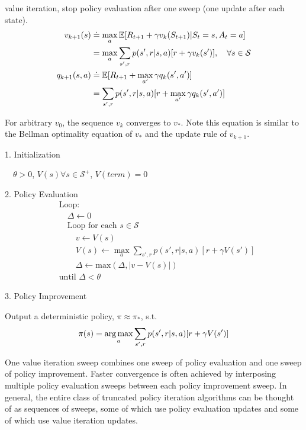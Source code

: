 \documentclass[sutton_barto_notes.tex]{subfiles}
\begin{document}
\begin{definition}
value iteration, stop policy evaluation after one sweep (one update after each state).
\begin{align*}
v_{k+1}(s) & \doteq \max_a \operatorname*{\mathbb{E}} [R_{t+1}+\gamma v_k(S_{t+1})|S_t = s, A_t = a]\\
& = \max_a \sum_{s',r} p(s',r|s,a)[r+\gamma v_k (s')],\quad \forall s \in \mathcal{S} \\
q_{k+1}(s,a) & \doteq \operatorname*{\mathbb{E}}[R_{t+1} + \max_{a'} \gamma q_k (s', a')] \\
& = \sum_{s',r} p(s',r|s,a)[r+\max_{a'} \gamma q_k (s',a')]
\end{align*}
\end{definition}
For arbitrary $v_0$, the sequence ${v_k}$ converges to $v_*$. Note this equation is similar to the Bellman optimality equation of $v_*$ and the update rule of $v_{k+1}$.

\begin{tcolorbox}[width=\textwidth,title={Value Iteration for estimating $\pi \approx \pi_*$}]
1. Initialization

$\quad\theta > 0$, $V(s) \forall s\in\mathcal{S}^+$, $V(term) = 0$

2. Policy Evaluation
\begin{align*}
&\text{Loop:}\\
&\quad\Delta \leftarrow 0\\
&\quad\text{Loop for each } s \in \mathcal{S}\\
&\quad\quad v \leftarrow V(s)\\
&\quad\quad V(s) \leftarrow \max_a \sum_{s',r} p(s',r|s,a)[r + \gamma V(s')]\\
&\quad\quad \Delta \leftarrow \text{max}(\Delta, |v-V(s)|)\\
&\text{until } \Delta < \theta
\end{align*}

3. Policy Improvement

Output a deterministic policy, $\pi \approx \pi_*$, s.t.
$$\pi(s) = \operatorname*{arg\,max}_a\sum_{s',r}p(s',r|s,a)[r+\gamma V(s')]$$
\end{tcolorbox}

One value iteration sweep combines one sweep of policy evaluation
and one sweep of policy improvement. Faster convergence is often achieved by interposing
multiple policy evaluation sweeps between each policy improvement sweep. In general,
the entire class of truncated policy iteration algorithms can be thought of as sequences
of sweeps, some of which use policy evaluation updates and some of which use value
iteration updates.
\end{document}
